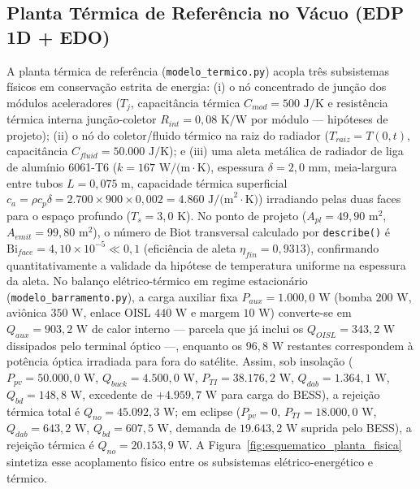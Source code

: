 \subsection{Planta Térmica de Referência no Vácuo (EDP 1D + EDO)}
\label{sec:planta_termica}

A planta térmica de referência (\texttt{modelo\_termico.py}) acopla três subsistemas físicos em conservação estrita de energia: (i) o nó concentrado de junção dos módulos aceleradores ($T_j$, capacitância térmica $C_{mod} = 500\text{ J/K}$ e resistência térmica interna junção-coletor $R_{int} = 0{,}08\text{ K/W}$ por módulo — hipóteses de projeto); (ii) o nó do coletor/fluido térmico na raiz do radiador ($T_{raiz} = T(0,t)$, capacitância $C_{fluid} = 50.000\text{ J/K}$); e (iii) uma aleta metálica de radiador de liga de alumínio 6061-T6 ($k = 167\text{ W/(m}\cdot\text{K)}$, espessura $\delta = 2{,}0\text{ mm}$, meia-largura entre tubos $L = 0{,}075\text{ m}$, capacidade térmica superficial $c_a = \rho c_p \delta = 2.700 \times 900 \times 0{,}002 = 4.860\text{ J/(m}^2\cdot\text{K)}$) irradiando pelas duas faces para o espaço profundo ($T_s = 3{,}0\text{ K}$). No ponto de projeto ($A_{pl} = 49{,}90\text{ m}^2$, $A_{emit} = 99{,}80\text{ m}^2$), o número de Biot transversal calculado por \texttt{describe()} é $\mathrm{Bi}_{face} = 4{,}10 \times 10^{-5} \ll 0{,}1$ (eficiência de aleta $\eta_{fin} = 0{,}9313$), confirmando quantitativamente a validade da hipótese de temperatura uniforme na espessura da aleta. No balanço elétrico-térmico em regime estacionário (\texttt{modelo\_barramento.py}), a carga auxiliar fixa $P_{aux} = 1.000{,}0\text{ W}$ (bomba $200\text{ W}$, aviônica $350\text{ W}$, enlace OISL $440\text{ W}$ e margem $10\text{ W}$) converte-se em $Q_{aux} = 903{,}2\text{ W}$ de calor interno — parcela que já inclui os $Q_{OISL} = 343{,}2\text{ W}$ dissipados pelo terminal óptico —, enquanto os $96{,}8\text{ W}$ restantes correspondem à potência óptica irradiada para fora do satélite. Assim, sob insolação ($P_{pv} = 50.000{,}0\text{ W}$, $Q_{buck} = 4.500{,}0\text{ W}$, $P_{TI} = 38.176{,}2\text{ W}$, $Q_{dab} = 1.364{,}1\text{ W}$, $Q_{bd} = 148{,}8\text{ W}$, excedente de $+4.959{,}7\text{ W}$ para carga do BESS), a rejeição térmica total é $Q_{no} = 45.092{,}3\text{ W}$; em eclipse ($P_{pv} = 0$, $P_{TI} = 18.000{,}0\text{ W}$, $Q_{dab} = 643{,}2\text{ W}$, $Q_{bd} = 607{,}5\text{ W}$, demanda de $19.643{,}2\text{ W}$ suprida pelo BESS), a rejeição térmica é $Q_{no} = 20.153{,}9\text{ W}$. A Figura~\ref{fig:esquematico_planta_fisica} sintetiza esse acoplamento físico entre os subsistemas elétrico-energético e térmico.


